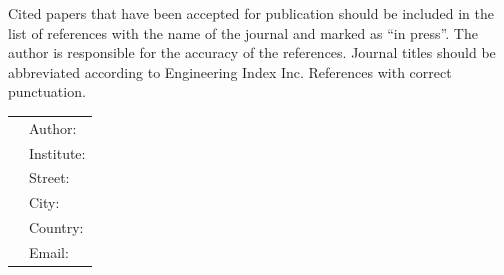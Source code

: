 \documentclass[nouppercase]{cmbec}
\begin{document}
Cited papers that have been accepted for publication should be included in the list of references with the name of the journal and marked as ``in press''. The author is responsible for the accuracy of the references. Journal titles should be abbreviated according to Engineering Index Inc. References with correct punctuation.



\begin{table}[ht]
\footnotesize
        \begin{tabular}{ll}
        &Author: \\
        &Institute: \\
        &Street: \\
        &City: \\
        &Country:  \\
        &Email: \\
        \end{tabular}
\end{table}
\end{document}
